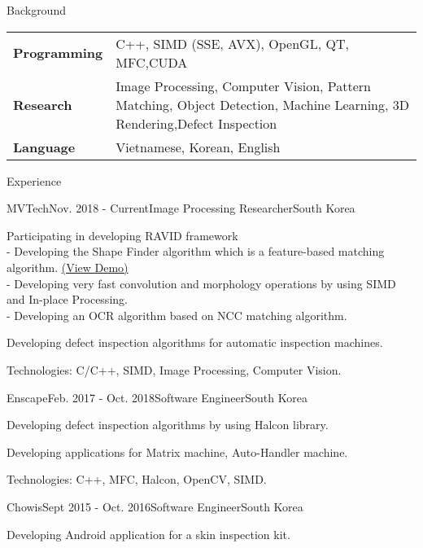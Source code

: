 \documentclass{resume}
\begin{document}
	\begin{rSection}{Background}
		\begin{tabular} {p{0.2\linewidth} p{0.8\linewidth}}
			\bf Programming & C++,  SIMD (SSE, AVX), OpenGL, QT, MFC,CUDA \\
			\bf Research & Image Processing,  Computer Vision, Pattern Matching, Object Detection,  Machine Learning, 3D Rendering,Defect Inspection \\
			\bf Language & Vietnamese, Korean, English
		\end{tabular}
		
	\end{rSection}

	\begin{rSection}{Experience}
		\begin{rSubsection}{MVTech}{Nov. 2018 - Current}{Image Processing Researcher}{South Korea}
			\item Participating in developing RAVID framework \\
			- Developing the Shape Finder algorithm which is a feature-based matching algorithm. \href{https://blog.naver.com/mvtech_ravid/222119961697}{(View Demo)}\\ 			
- Developing very fast convolution and morphology operations by using SIMD and In-place Processing. \\
			- Developing an OCR algorithm based on NCC matching algorithm.\\	
			\item Developing defect inspection algorithms for automatic inspection machines.
			\item Technologies: C/C++, SIMD, Image Processing, Computer Vision.

		\end{rSubsection}

		\begin{rSubsection}{Enscape}{Feb. 2017 - Oct. 2018}{Software Engineer}{South Korea}
			\item Developing defect inspection algorithms by using Halcon library.
			\item Developing applications for Matrix machine, Auto-Handler machine.
			\item Technologies: C++, MFC, Halcon, OpenCV, SIMD.

		\end{rSubsection}

		\begin{rSubsection}{Chowis}{Sept 2015 - Oct. 2016}{Software Engineer}{South Korea}
			\item Developing Android application for a skin inspection kit.

		\end{rSubsection}
	\end{rSection}
\end{document}
